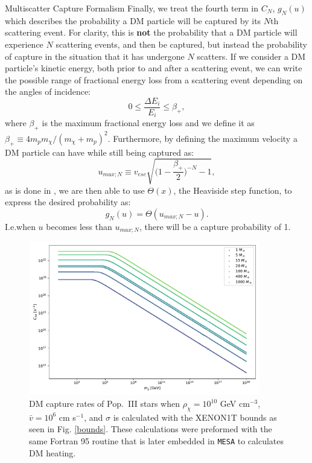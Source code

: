 \documentclass[a4paper,11pt]{article}
\begin{document}
\begin{section}{Multiscatter Capture Formalism}
    Finally, we treat the fourth term in $C_N$, $g_N(u)$ which describes the probability a DM particle will be captured by its $N$th scattering event.
    For clarity, this is \textbf{not} the probability that a DM particle will experience $N$ scattering events, and then be captured, but instead the probability of capture in the situation that it has undergone $N$ scatters. 
    If we consider a DM particle's kinetic energy, both prior to and after a scattering event, we can write the possible range of fractional energy loss from a scattering event depending on the angles of incidence:
    \begin{equation}
    0 \leq \frac{\Delta E_i}{E_i} \leq \beta_+,
    \end{equation}
    where $\beta_+$ is the maximum fractional energy loss and we define it as $\beta_+ \equiv 4m_p m_{\chi}/(m_{\chi} + m_p)^2$. 
    Furthermore, by defining the maximum velocity a DM particle can have while still being captured as:
    \begin{equation}
    u_{max;N} \equiv v_{esc} \sqrt{\Big(1- \frac{\beta_+}{2}\Big)^{-N} - 1},
    \end{equation}
    as is done in \cite{Bramante:2017}, we are then able to use $\Theta(x)$, the Heaviside step function, to express the desired probability as:
    \begin{equation}
    g_N(u) = \Theta(u_{max;N} - u).
    \end{equation}
    I.e.\text{ }when $u$ becomes less than $u_{max;N}$, there will be a capture probability of 1.

    \begin{figure}
        \centering
        \includegraphics[width=0.9\textwidth]{Ctot1.pdf}
        \caption{DM capture rates of Pop.~III stars when $\rho_\chi = 10^{10}$ GeV cm$^{-3}$, $\bar{v} = 10^6$ cm s$^{-1}$, and $\sigma$ is calculated with the XENON1T bounds as seen in Fig. \ref{bounds}. These calculations were preformed with the same Fortran 95 routine that is later embedded in \texttt{MESA} to calculates DM heating.}
    \end{figure}


\end{section}
\end{document}

